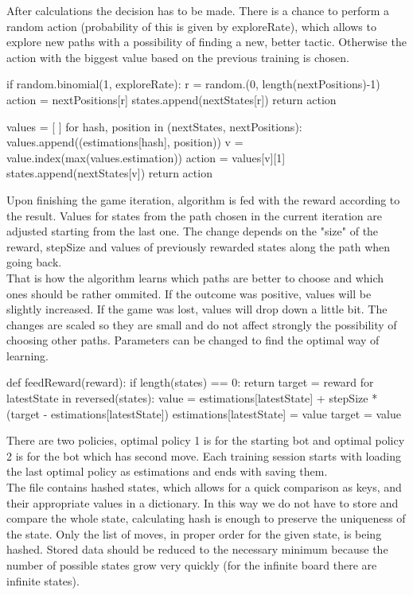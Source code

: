 \documentclass[a4paper,12pt]{book}
\begin{document}
After calculations the decision has to be made. There is a chance to perform a random action (probability of this is given by exploreRate), which allows to explore new paths with a possibility of finding a new, better tactic. Otherwise the action with the biggest value based on the previous training is chosen.

\begin{python}
if random.binomial(1, exploreRate):
	r = random.(0, length(nextPositions)-1)
	action = nextPositions[r]
	states.append(nextStates[r])
	return action

values = [ ]
for hash, position in (nextStates, nextPositions):
	values.append((estimations[hash], position))
v = value.index(max(values.estimation))
action = values[v][1]
states.append(nextStates[v])
return action	
\end{python}

Upon finishing the game iteration, algorithm is fed with the reward according to the result. Values for states from the path chosen in the current iteration are adjusted starting from the last one. The change depends on the "size" of the reward, stepSize and values of previously rewarded states along the path when going back. \\That is how the algorithm learns which paths are better to choose and which ones should be rather ommited. If the outcome was positive, values will be slightly increased. If the game was lost, values will drop down a little bit. The changes are scaled so they are small and do not affect strongly the possibility of choosing other paths. Parameters can be changed to find the optimal way of learning.

\begin{python}
def feedReward(reward):
  if length(states) == 0:
    return
  target = reward
  for latestState in reversed(states):
    value = estimations[latestState] 
		+ stepSize * (target - estimations[latestState])
    estimations[latestState] = value
    target = value
\end{python}

There are two policies, optimal policy 1 is for the starting bot and optimal policy 2 is for the bot which has second move. Each training session starts with loading the last optimal policy as estimations and ends with saving them. 
	\\The file contains hashed states, which allows for a quick comparison as keys, and their appropriate values in a dictionary. In this way we do not have to store and compare the whole state, calculating hash is enough to preserve the uniqueness of the state. Only the list of moves, in proper order for the given state, is being hashed. Stored data should be reduced to the necessary minimum because the number of possible states grow very quickly (for the infinite board there are infinite states).
\end{document}
